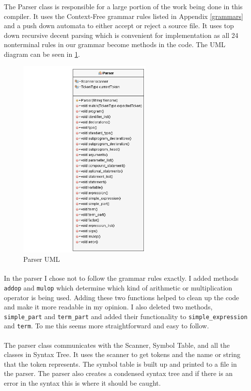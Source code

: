 \documentclass[10]{article}
\begin{document}
The Parser class is responsible for a large portion of the work being done in this compiler. It uses the Context-Free grammar rules listed in Appendix \ref{grammars} and a push down automata to either accept or reject a source file. It uses top down recursive decent parsing which is convenient for implementation as all 24 nonterminal rules in our grammar become methods in the code. The UML diagram can be seen in \ref{fig: fg3}.
\begin{figure}[!ht]
	\includegraphics[height=4in]{ParserUML.png}
	\caption{Parser UML \label{fig: fg3}}
\end{figure}

\paragraph{}
In the parser I chose not to follow the grammar rules exactly. I added methods \verb|addop| and \verb|mulop| which determine which kind of arithmetic or multiplication operator is being used. Adding these two functions helped to clean up the code and make it more readable in my opinion. I also deleted two methods, \verb|simple_part| and \verb|term_part| and added their functionality to \verb|simple_expression| and \verb|term|. To me this seems more straightforward and easy to follow.

\paragraph{}
The parser class communicates with the Scanner, Symbol Table, and all the classes in Syntax Tree. It uses the scanner to get tokens and the name or string that the token represents. The symbol table is built up and printed to a file in the parser. The parser also creates a condensed syntax tree and if there is an error in the syntax this is where it should be caught. 
\end{document}
